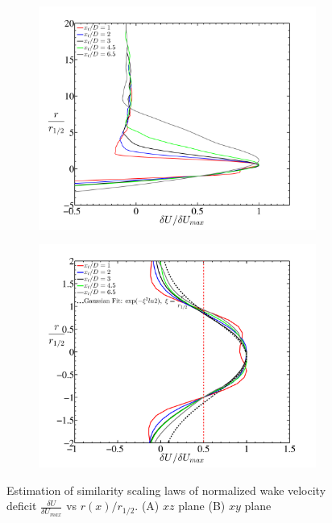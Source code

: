 \begin{figure}
\centering
        \begin{subfigure}[t]{0.5\textwidth}
                \includegraphics[width=\linewidth]{stats/similarity_velprof_Npts_zavg.pdf}
                \caption{}
                \label{fig:mean1}
        \end{subfigure}%
        \centering
        \begin{subfigure}[t]{0.5\textwidth}
                \includegraphics[width=\linewidth]{stats/similarity_velprof_Npts_2b.pdf}
                \caption{}
                \label{fig:mean2}
        \end{subfigure}
        \caption[Wake similarity laws]{Estimation of similarity scaling laws of normalized wake velocity deficit $\frac{\delta U}{\delta U_{max}}$ vs $r(x)/r_{1/2}$. (A) $xz$ plane (B) $xy$ plane} \label{fig:similarity}
\end{figure}
    
